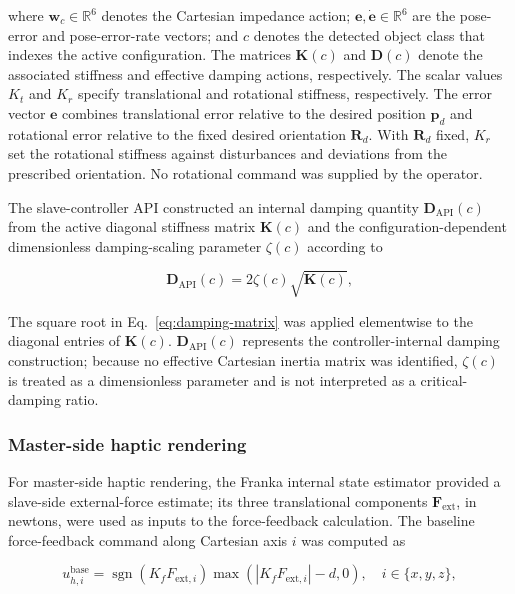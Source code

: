 where $\mathbf{w}_c\in\mathbb{R}^6$ denotes the Cartesian impedance action; $\mathbf{e},\dot{\mathbf{e}}\in\mathbb{R}^6$ are the pose-error and pose-error-rate vectors; and $c$ denotes the detected object class that indexes the active configuration. The matrices $\mathbf{K}(c)$ and $\mathbf{D}(c)$ denote the associated stiffness and effective damping actions, respectively. The scalar values $K_t$ and $K_r$ specify translational and rotational stiffness, respectively. The error vector $\mathbf{e}$ combines translational error relative to the desired position $\mathbf{p}_d$ and rotational error relative to the fixed desired orientation $\mathbf{R}_d$. With $\mathbf{R}_d$ fixed, $K_r$ set the rotational stiffness against disturbances and deviations from the prescribed orientation. No rotational command was supplied by the operator.

The slave-controller API constructed an internal damping quantity $\mathbf{D}_{\mathrm{API}}(c)$ from the active diagonal stiffness matrix $\mathbf{K}(c)$ and the configuration-dependent dimensionless damping-scaling parameter $\zeta(c)$ according to

\begin{equation}
\label{eq:damping-matrix}
\mathbf{D}_{\mathrm{API}}(c)=2\zeta(c)\sqrt{\mathbf{K}(c)},
\end{equation}

The square root in Eq.~\eqref{eq:damping-matrix} was applied elementwise to the diagonal entries of $\mathbf{K}(c)$. $\mathbf{D}_{\mathrm{API}}(c)$ represents the controller-internal damping construction; because no effective Cartesian inertia matrix was identified, $\zeta(c)$ is treated as a dimensionless parameter and is not interpreted as a critical-damping ratio.

\subsubsection{Master-side haptic rendering}
For master-side haptic rendering, the Franka internal state estimator provided a slave-side external-force estimate; its three translational components $\mathbf{F}_{\mathrm{ext}}$, in newtons, were used as inputs to the force-feedback calculation. The baseline force-feedback command along Cartesian axis $i$ was computed as

\begin{equation}
\label{eq:baseline-haptic-command}
u_{h,i}^{\mathrm{base}}=
\operatorname{sgn}\!\left(K_fF_{\mathrm{ext},i}\right)
\max\!\left(\left|K_fF_{\mathrm{ext},i}\right|-d,0\right),
\quad i\in\{x,y,z\},
\end{equation}

